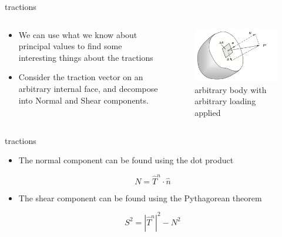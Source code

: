 \documentclass[
  letterpaper,
  ignorenonframetext,
  aspectratio=43,
  handout,
  12pt]{beamer}
\providecommand{\tightlist}{%
  \setlength{\itemsep}{0pt}\setlength{\parskip}{0pt}}
\providecommand{\tightlist}{%
\setlength{\itemsep}{0pt}\setlength{\parskip}{0pt}}
\let\Oldincludegraphics\includegraphics
\renewcommand{\includegraphics}[2][]{\Oldincludegraphics[width=\textwidth,height=0.7\textheight,keepaspectratio]{#2}}
\begin{document}
\begin{frame}{tractions}
\protect\hypertarget{tractions}{}
\begin{columns}[T]
\begin{column}{0.5\textwidth}
\begin{itemize}
\tightlist
\item
  We can use what we know about principal values to find some
  interesting things about the tractions
\item
  Consider the traction vector on an arbitrary internal face, and
  decompose into Normal and Shear components.
\end{itemize}
\end{column}

\begin{column}{0.5\textwidth}
\begin{figure}
\centering
\includegraphics{../images/potato.PNG}
\caption{arbitrary body with arbitrary loading applied}
\end{figure}
\end{column}
\end{columns}
\end{frame}

\begin{frame}{tractions}
\protect\hypertarget{tractions-1}{}
\begin{itemize}
\tightlist
\item
  The normal component can be found using the dot product
\end{itemize}

\[N = \hat{T}^n \cdot \hat{n}\]

\begin{itemize}
\tightlist
\item
  The shear component can be found using the Pythagorean theorem
\end{itemize}

\[S^2 = |\hat{T}^n|^2 - N^2\]
\end{frame}
\end{document}
